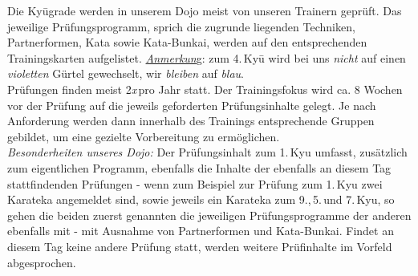 \begin{center}
{\begin{center}
		\end{center}

		Die Ky\={u}grade werden in unserem Dojo meist von unseren Trainern geprüft. Das jeweilige Prüfungsprogramm, sprich die zugrunde liegenden Techniken, Partnerformen, Kata sowie Kata-Bunkai, werden auf den entsprechenden Trainingskarten aufgelistet. \textit{\underline{Anmerkun}}g: zum 4.\,Ky\={u} wird bei uns \textit{nicht} auf einen \textit{violetten} Gürtel gewechselt, wir \textit{bleiben} auf \textit{blau}.\\

		Prüfungen finden meist 2\textit{x}\,pro Jahr statt. Der Trainingsfokus wird ca. 8 Wochen vor der Prüfung auf die jeweils geforderten Prüfungsinhalte gelegt. Je nach Anforderung werden dann innerhalb des Trainings entsprechende Gruppen gebildet, um eine gezielte Vorbereitung zu ermöglichen.\\

		\textit{Besonderheiten unseres Dojo:} Der Prüfungsinhalt zum 1.\,Kyu umfasst, zusätzlich zum eigentlichen Programm, ebenfalls die Inhalte der ebenfalls an diesem Tag stattfindenden Prüfungen - wenn zum Beispiel zur Prüfung zum 1.\,Kyu zwei Karateka angemeldet sind, sowie jeweils ein Karateka zum 9.,\,5.\,und 7.\,Kyu, so gehen die beiden zuerst genannten die jeweiligen Prüfungsprogramme der anderen ebenfalls mit - mit Ausnahme von Partnerformen und Kata-Bunkai. Findet an diesem Tag keine andere Prüfung statt, werden weitere Prüfinhalte im Vorfeld abgesprochen.
	}
	\end{center}\null\vfill\null
	\setlength{\tabcolsep}{6pt}